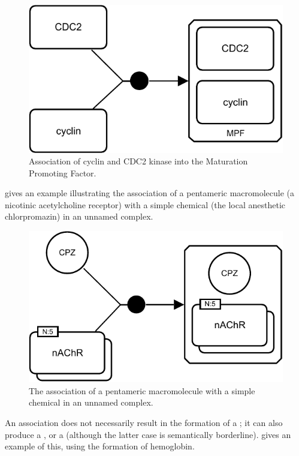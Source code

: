 \begin{figure}[H]
  \centering
  \includegraphics[scale = 0.8]{examples/association-MPF}
  \caption{Association of cyclin and CDC2 kinase into the Maturation Promoting Factor.}
  \label{fig:assoc-cyclin}
\end{figure}

 gives an example illustrating the association of a pentameric macromolecule (a nicotinic acetylcholine receptor) with a simple chemical (the local anesthetic chlorpromazin) in an unnamed complex.

\begin{figure}[H]
  \centering
  \includegraphics[scale = 0.8]{examples/association-unamed}
  \caption{The association of a pentameric macromolecule with a simple chemical in an unnamed complex.}
  \label{fig:assoc-unamed}
\end{figure}

An association does not necessarily result in the formation of a ; it can also produce a , or a  (although the latter case is semantically borderline).   gives an example of this, using the formation of hemoglobin.


